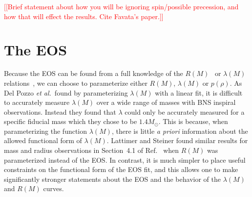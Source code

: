 \documentclass[twocolumn,prd,amssymb,aps,nofootinbib,showpacs,epsf]{revtex4}
\newcommand{\red}{\textcolor{red}}
\begin{document}
%

\red{[[Brief statement about how you will be ignoring spin/possible precession, and how that will effect the results. Cite Favata's paper.]]}


\section{The EOS}
\label{sec:eos}

Because the EOS can be found from a full knowledge of the $R(M)$~\cite{Lindblom1992} or $\lambda(M)$ relations~\cite{LindblomIndik2012, LindblomIndik2014}, we can choose to parameterize either $R(M)$, $\lambda(M)$ or $p(\rho)$. As Del Pozzo {\it et al.}\ found by parameterizing $\lambda(M)$ with a linear fit, it is difficult to accurately measure $\lambda(M)$ over a wide range of masses with BNS inspiral observations. Instead they found that $\lambda$ could only be accurately measured for a specific fiducial mass which they chose to be $1.4M_\odot$. This is because, when parameterizing the function $\lambda(M)$, there is little {\it a priori} information about the allowed functional form of $\lambda(M)$. Lattimer and Steiner found similar results for mass and radius observations in Section~4.1 of Ref.~\cite{LattimerSteiner2014} when $R(M)$ was parameterized instead of the EOS. In contrast, it is much simpler to place useful constraints on the functional form of the EOS fit, and this allows one to make significantly stronger statements about the EOS and the behavior of the $\lambda(M)$ and $R(M)$ curves.
\end{document}
